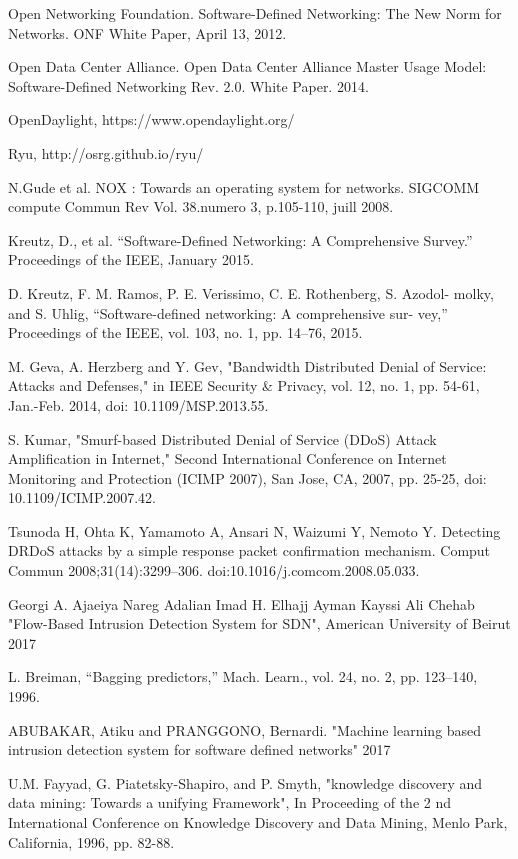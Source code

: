 \frontmatter
\begin{thebibliography}{9}

\bibitem{} 
Open Networking Foundation. Software-Defined Networking: The New Norm
for Networks. ONF White Paper, April 13, 2012.

\bibitem{} 
Open Data Center Alliance. Open Data Center
Alliance Master Usage Model: Software-Defined
Networking Rev. 2.0. White Paper. 2014.

\bibitem{} 
OpenDaylight, https://www.opendaylight.org/

\bibitem{} 
Ryu, http://osrg.github.io/ryu/

\bibitem{}
N.Gude et al. NOX : Towards an operating system for networks. SIGCOMM compute
Commun Rev Vol. 38.numero 3, p.105-110, juill 2008.

\bibitem{} 
Kreutz, D., et al. “Software-Defined Networking: A Comprehensive Survey.”
Proceedings of the IEEE, January 2015.

\bibitem{} 
D. Kreutz, F. M. Ramos, P. E. Verissimo, C. E. Rothenberg, S. Azodol-
molky, and S. Uhlig, “Software-defined networking: A comprehensive sur-
vey,” Proceedings of the IEEE, vol. 103, no. 1, pp. 14–76, 2015.

\bibitem{}
M. Geva, A. Herzberg and Y. Gev, "Bandwidth Distributed Denial of Service: Attacks and Defenses," in IEEE Security \& Privacy, vol. 12, no. 1, pp. 54-61, Jan.-Feb. 2014, doi: 10.1109/MSP.2013.55.

\bibitem{}
S. Kumar, "Smurf-based Distributed Denial of Service (DDoS) Attack Amplification in Internet," Second International Conference on Internet Monitoring and Protection (ICIMP 2007), San Jose, CA, 2007, pp. 25-25, doi: 10.1109/ICIMP.2007.42.

\bibitem{}
Tsunoda H, Ohta K, Yamamoto A, Ansari N, Waizumi Y, Nemoto Y. Detecting DRDoS attacks by a simple response packet confirmation mechanism. Comput Commun 2008;31(14):3299–306. doi:10.1016/j.comcom.2008.05.033.

\bibitem{}
Georgi A. Ajaeiya Nareg Adalian Imad H. Elhajj Ayman Kayssi Ali Chehab "Flow-Based Intrusion Detection System for SDN", American University of Beirut 2017

\bibitem{}
L. Breiman, “Bagging predictors,” Mach. Learn., vol.
24, no. 2, pp. 123–140, 1996. 

\bibitem{}
ABUBAKAR, Atiku and PRANGGONO, Bernardi. "Machine learning based intrusion detection system for
software defined networks" 2017

\bibitem{}
U.M. Fayyad, G. Piatetsky-Shapiro, and P. Smyth, "knowledge discovery and data mining: Towards a unifying Framework", In Proceeding of the 2 nd International Conference on Knowledge Discovery and Data Mining, Menlo Park, California, 1996, pp. 82-88.


\end{thebibliography}
